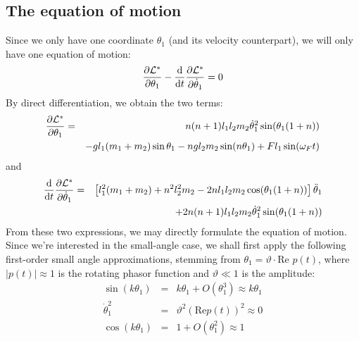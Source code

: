\documentclass[12pt]{article}
\begin{document}
	\subsection{The equation of motion}
	Since we only have one coordinate $\theta_1$ (and its velocity counterpart), we will only have one equation of motion:
	$$\pdv{\mathcal{L}^*}{\theta_1}-\dv{}{t}\pdv{\mathcal{L}^*}{\dot{\theta}_1}=0$$
	By direct differentiation, we obtain the two terms:
	\begin{eqnarray*}
	\pdv{\mathcal{L}^*}{\theta_1}&=&n(n+1)l_1l_2m_2\dot{\theta}_1^2\sin(\theta_1(1+n))\\
	&&-gl_1(m_1+m_2)\sin{\theta_1}-ngl_2m_2\sin(n\theta_1)+Fl_1\sin(\omega_Ft)
	\end{eqnarray*}
	and
	\begin{eqnarray*}
	\dv{}{t}\pdv{\mathcal{L}^*}{\dot{\theta}_1}&=&\left[l_1^2(m_1+m_2)+n^2l_2^2m_2-2nl_1l_2m_2\cos(\theta_1(1+n                   ))\right]\ddot{\theta}_1\\
	&&+2n(n+1)l_1l_2m_2\dot{\theta}_1^2\sin(\theta_1(1+n))
	\end{eqnarray*}
	From these two expressions, we may directly formulate the equation of motion. Since we're interested in the small-angle case, we shall first apply the following first-order small angle approximations, stemming from $\theta_1 = \vartheta\cdot \mbox{Re }p(t)$, where $|p(t)|\approx 1$ is the rotating phasor function and $\vartheta \ll 1$ is the amplitude:
	\begin{eqnarray*}
	\sin(k\theta_1)&=&k\theta_1+O(\theta_1^3)\approx k\theta_1\\
	\dot{\theta}_1^2&=&\vartheta^2 \left(\mbox{Re}p(t)\right)^2 \approx 0\\
	\cos(k\theta_1)&=&1+O(\theta_1^2)\approx 1
	\end{eqnarray*}
	
	
\end{document}
